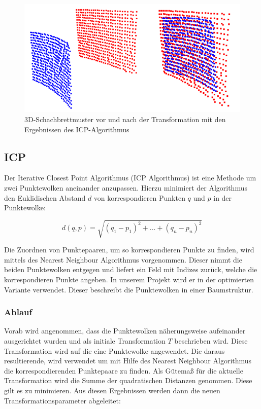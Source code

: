 \begin{figure}[H]
	\includegraphics[scale=1.0]{bilder/icpresult}
	\caption[3D-Schachbrettmuster vor und nach der Transformation mit den Ergebnissen des ICP-Algorithmus]{3D-Schachbrettmuster vor und nach der Transformation mit den Ergebnissen des ICP-Algorithmus}
	\label{fig:icpresult}
\end{figure}

\subsection{ICP}
\label{sec:icp}

Der Iterative Closest Point Algorithmus (ICP Algorithmus) ist eine Methode um zwei Punktewolken aneinander anzupassen.
Hierzu minimiert der Algorithmus den Euklidischen Abstand $d$ von korrespondieren Punkten $q$ und $p$ in der Punktewolke:

\begin{equation}
d(q,p) = \sqrt{(q_{1}-p_{1})^{2} + ... + 
	(q_{n} -p_{n})^{2}}
\end{equation}

\noindent Die Zuordnen von Punktepaaren, um so korrespondieren Punkte zu finden, wird mittels des Nearest Neighbour Algorithmus vorgenommen. Dieser nimmt die beiden Punktewolken entgegen und liefert ein Feld mit Indizes zurück, welche die korrespondieren Punkte angeben. In unserem Projekt wird er in der optimierten Variante verwendet. Dieser beschreibt die Punktewolken in einer Baumstruktur.

\subsubsection{Ablauf}
\label{ss:ablauf}

Vorab wird angenommen, dass die Punktewolken näherungsweise aufeinander ausgerichtet wurden und als
initiale Transformation $T$ beschrieben wird. Diese Transformation wird auf die eine Punktewolke angewendet. Die daraus resultierende, wird verwendet um mit Hilfe des Nearest Neighbour Algorithmus die korrespondierenden Punktepaare zu finden. 
Als Gütemaß für die aktuelle Transformation wird die Summe der quadratischen Distanzen genommen. Diese gilt es zu minimieren. Aus diesen Ergebnissen werden dann die neuen Transformationsparameter abgeleitet:

